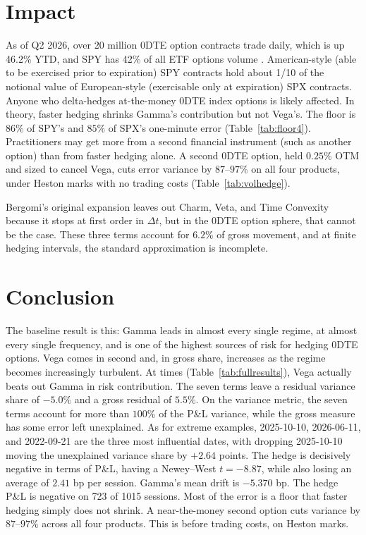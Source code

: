 \documentclass[11pt]{article}
\begin{document}
\section{Impact}
\label{sec:impact}

As of Q2 2026, over 20 million 0DTE option contracts trade daily, which is up 46.2\% YTD, and SPY has 42\% of all ETF options volume \cite{cboeq22026}.
American-style (able to be exercised prior to expiration) SPY contracts hold about 1/10 of the notional value of European-style (exercisable only at expiration) SPX contracts.
Anyone who delta-hedges at-the-money 0DTE index options is likely affected. In theory, faster hedging shrinks Gamma's contribution but not Vega's. The floor is $86\%$ of SPY's and $85\%$ of SPX's one-minute error (Table~\ref{tab:floor4}). Practitioners may get more from a second financial instrument (such as another option) than from faster hedging alone. A second 0DTE option, held $0.25\%$ OTM and sized to cancel Vega, cuts error variance by $87$--$97\%$ on all four products, under Heston marks with no trading costs (Table~\ref{tab:volhedge}).

Bergomi's original expansion leaves out Charm, Veta, and Time Convexity because it stops at first order in $\Delta t$, but in the 0DTE option sphere, that cannot be the case.
These three terms account for $6.2\%$ of gross movement, and at finite hedging intervals, the standard approximation is incomplete.

\section{Conclusion}

The baseline result is this: Gamma leads in almost every single regime, at almost every single frequency, and is one of the highest sources of risk for hedging 0DTE options. Vega comes in second and, in gross share, increases as the regime becomes increasingly turbulent. At times (Table~\ref{tab:fullresults}), Vega actually
beats out Gamma in risk contribution. The seven terms leave a residual variance share of $-5.0\%$ and a gross residual of $5.5\%$. On the variance metric, the seven terms account for more than $100\%$ of the P\&L variance, while the gross measure has some error left unexplained. As for extreme examples, 2025-10-10, 2026-06-11, and 2022-09-21 are the three most influential dates, with dropping 2025-10-10 moving the unexplained variance share by $+2.64$ points. 
The hedge is decisively negative in terms of P\&L, having a Newey--West $t = -8.87$, while also losing an average of $2.41$ bp per session. Gamma's mean drift is $-5.370$ bp. The hedge P\&L is negative on 723 of 1015 sessions. Most of the error is a floor that faster hedging simply does not shrink. A near-the-money second option cuts variance by $87$--$97\%$ across all four products. This is before trading costs, on Heston marks. 
 
\end{document}

